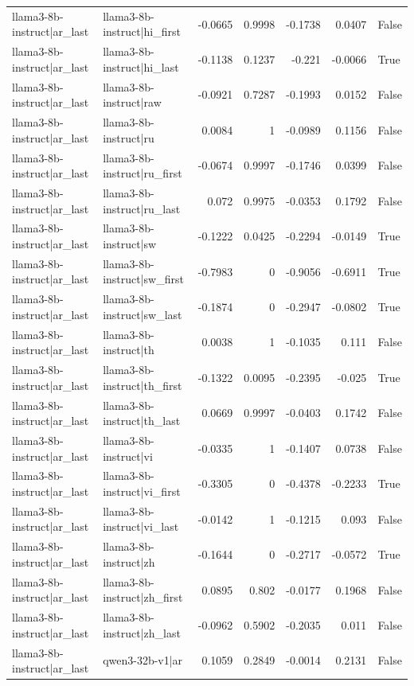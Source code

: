 \begin{table}
\begin{tabular}{l l r r r r l}
llama3-8b-instruct|ar_last & llama3-8b-instruct|hi_first & -0.0665 & 0.9998 & -0.1738 & 0.0407 & False \\
llama3-8b-instruct|ar_last & llama3-8b-instruct|hi_last & -0.1138 & 0.1237 & -0.221 & -0.0066 & True \\
llama3-8b-instruct|ar_last & llama3-8b-instruct|raw & -0.0921 & 0.7287 & -0.1993 & 0.0152 & False \\
llama3-8b-instruct|ar_last & llama3-8b-instruct|ru & 0.0084 & 1 & -0.0989 & 0.1156 & False \\
llama3-8b-instruct|ar_last & llama3-8b-instruct|ru_first & -0.0674 & 0.9997 & -0.1746 & 0.0399 & False \\
llama3-8b-instruct|ar_last & llama3-8b-instruct|ru_last & 0.072 & 0.9975 & -0.0353 & 0.1792 & False \\
llama3-8b-instruct|ar_last & llama3-8b-instruct|sw & -0.1222 & 0.0425 & -0.2294 & -0.0149 & True \\
llama3-8b-instruct|ar_last & llama3-8b-instruct|sw_first & -0.7983 & 0 & -0.9056 & -0.6911 & True \\
llama3-8b-instruct|ar_last & llama3-8b-instruct|sw_last & -0.1874 & 0 & -0.2947 & -0.0802 & True \\
llama3-8b-instruct|ar_last & llama3-8b-instruct|th & 0.0038 & 1 & -0.1035 & 0.111 & False \\
llama3-8b-instruct|ar_last & llama3-8b-instruct|th_first & -0.1322 & 0.0095 & -0.2395 & -0.025 & True \\
llama3-8b-instruct|ar_last & llama3-8b-instruct|th_last & 0.0669 & 0.9997 & -0.0403 & 0.1742 & False \\
llama3-8b-instruct|ar_last & llama3-8b-instruct|vi & -0.0335 & 1 & -0.1407 & 0.0738 & False \\
llama3-8b-instruct|ar_last & llama3-8b-instruct|vi_first & -0.3305 & 0 & -0.4378 & -0.2233 & True \\
llama3-8b-instruct|ar_last & llama3-8b-instruct|vi_last & -0.0142 & 1 & -0.1215 & 0.093 & False \\
llama3-8b-instruct|ar_last & llama3-8b-instruct|zh & -0.1644 & 0 & -0.2717 & -0.0572 & True \\
llama3-8b-instruct|ar_last & llama3-8b-instruct|zh_first & 0.0895 & 0.802 & -0.0177 & 0.1968 & False \\
llama3-8b-instruct|ar_last & llama3-8b-instruct|zh_last & -0.0962 & 0.5902 & -0.2035 & 0.011 & False \\
llama3-8b-instruct|ar_last & qwen3-32b-v1|ar & 0.1059 & 0.2849 & -0.0014 & 0.2131 & False \\

\end{tabular}
\end{table}
